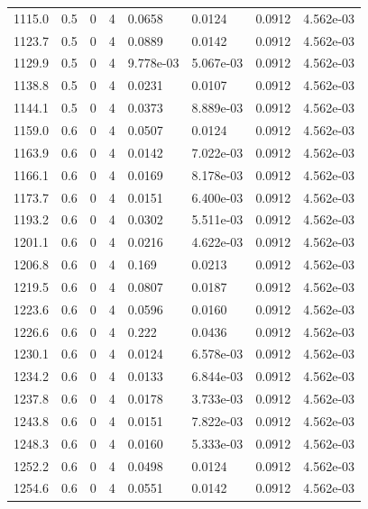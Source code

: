 \documentclass[preview]{standalone}
\begin{document}
{{{{{{\begin{tabular}{L{1.2cm}C{1.2cm} C{0.3cm}C{0.5cm} C{1.4cm}C{1.4cm} C{1.4cm}C{1.4cm}}
  1115.0  &   0.5  & 0     &  4 &  0.0658  & 0.0124  & 0.0912 &  4.562e-03   \\ 
  1123.7  &   0.5  & 0     &  4 &  0.0889  & 0.0142  & 0.0912 &  4.562e-03   \\ 
  1129.9  &   0.5  & 0     &  4 &  9.778e-03  & 5.067e-03  & 0.0912 &  4.562e-03   \\ 
  1138.8  &   0.5  & 0     &  4 &  0.0231  & 0.0107  & 0.0912 &  4.562e-03   \\ 
  1144.1  &   0.5  & 0     &  4 &  0.0373  & 8.889e-03  & 0.0912 &  4.562e-03   \\ 
  1159.0  &   0.6  & 0     &  4 &  0.0507  & 0.0124  & 0.0912 &  4.562e-03   \\ 
  1163.9  &   0.6  & 0     &  4 &  0.0142  & 7.022e-03  & 0.0912 &  4.562e-03   \\ 
  1166.1  &   0.6  & 0     &  4 &  0.0169  & 8.178e-03  & 0.0912 &  4.562e-03   \\ 
  1173.7  &   0.6  & 0     &  4 &  0.0151  & 6.400e-03  & 0.0912 &  4.562e-03   \\ 
  1193.2  &   0.6  & 0     &  4 &  0.0302  & 5.511e-03  & 0.0912 &  4.562e-03   \\ 
  1201.1  &   0.6  & 0     &  4 &  0.0216  & 4.622e-03  & 0.0912 &  4.562e-03   \\ 
  1206.8  &   0.6  & 0     &  4 &  0.169  & 0.0213  & 0.0912 &  4.562e-03   \\ 
  1219.5  &   0.6  & 0     &  4 &  0.0807  & 0.0187  & 0.0912 &  4.562e-03   \\ 
  1223.6  &   0.6  & 0     &  4 &  0.0596  & 0.0160  & 0.0912 &  4.562e-03   \\ 
  1226.6  &   0.6  & 0     &  4 &  0.222  & 0.0436  & 0.0912 &  4.562e-03   \\ 
  1230.1  &   0.6  & 0     &  4 &  0.0124  & 6.578e-03  & 0.0912 &  4.562e-03   \\ 
  1234.2  &   0.6  & 0     &  4 &  0.0133  & 6.844e-03  & 0.0912 &  4.562e-03   \\ 
  1237.8  &   0.6  & 0     &  4 &  0.0178  & 3.733e-03  & 0.0912 &  4.562e-03   \\ 
  1243.8  &   0.6  & 0     &  4 &  0.0151  & 7.822e-03  & 0.0912 &  4.562e-03   \\ 
  1248.3  &   0.6  & 0     &  4 &  0.0160  & 5.333e-03  & 0.0912 &  4.562e-03   \\ 
  1252.2  &   0.6  & 0     &  4 &  0.0498  & 0.0124  & 0.0912 &  4.562e-03   \\ 
  1254.6  &   0.6  & 0     &  4 &  0.0551  & 0.0142  & 0.0912 &  4.562e-03   \\ 

\end{tabular}}}}}}}
\end{document}
